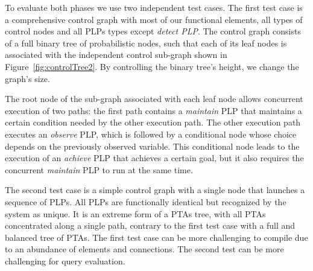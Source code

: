 \documentclass[letterpaper]{article}
\newcommand{\frameImage}[4]{
\begin{figure}[H]
  \centerline{
    \fcolorbox{frameColor}{white}{
        \texttt{[image: \#1]} } }
    \caption{#4}
    \label{fig:#1}
\end{figure}
}
\begin{document}
To evaluate
both phases we use two independent test cases.
The first test case is a comprehensive control graph
with most of our functional elements, all types of control nodes and all PLPs types except {\em detect PLP}. The control graph
consists of a full binary tree of probabilistic nodes, such that
each of its leaf nodes
is associated with the independent control sub-graph shown in Figure~\ref{fig:controlTree2}.
By controlling the binary tree's height,
we  change the graph's size.


The root node of the sub-graph associated with each leaf node
allows concurrent execution of two paths: the first path contains a {\em maintain} PLP that maintains a certain condition needed by the other execution path. The other execution path
executes an {\em observe} PLP, which is followed by a conditional node whose choice depends
on the previously observed variable. This conditional node leads to the execution of an {\em achieve} PLP that achieves a certain goal, but it also requires the concurrent {\em maintain} PLP to run at the same time.

The second test case  is a  simple control graph with a single node that launches a sequence of PLPs. All PLPs are functionally identical but recognized by the system as unique.
It is an extreme form of a PTAs tree, with all PTAs concentrated along a single path, contrary to the first test case with a full and balanced tree of PTAs. The first test case can be more challenging to compile due to an abundance of elements and connections. The second test can be more challenging for query evaluation.
\end{document}
